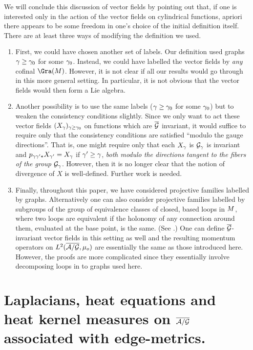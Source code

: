 \medskip

We will conclude this discussion of vector fields by pointing out
that, if one is interested only in the action of the vector fields on
cylindrical functions, apriori there appears to be some freedom in
one's choice of the initial definition itself. There are at least
three ways of modifying the definition we used.
 
\begin{enumerate}
\item First, we could have chosen another set of labels. Our definition
used graphs $\g\ge\g_0$ for some $\g_0$. Instead, we could have
labelled the vector fields by {\it any} cofinal $\Gra(\S)$.
However, it is not clear if all our results would go through in this
more general setting. In particular, it is not obvious that the vector
fields would then form a Lie algebra.
\item
Another possibility is to use the same labels ($\g\ge\g_0$ for some
$\g_0$) but to weaken the consistency conditions slightly. Since we
only want to act these vector fields $(X_\g)_{\g\ge\g_0}$ on functions
which are $\Gb$ invariant, it would suffice to require only that the
consistency conditions are satisfied ``modulo the gauge directions''.
That is, one might require only that each $X_\g$ is $\G_\g$ is
invariant and $p_{\g\g'\star}X_{\g'} = X_\g$ if $\g'\ge \g$, {\it both
modulo the directions tangent to the fibers of the group $\G_\g$}.
However, then it is no longer clear that the notion of divergence of
$X$ is well-defined. Further work is needed.
\item
Finally, throughout this paper, we have considered projective families
labelled by graphs. Alternatively one can also consider projective
families labelled by subgroups of the group of equivalence classes of
closed, based loops in $\S$, where two loops are equivalent if the
holonomy of any connection around them, evaluated at the base point,
is the same. (See \cite{MM,AL2}.) One can define $\Gb$-invariant
vector fields in this setting as well and the resulting momentum
operators on $L^2(\agb, \mu_o)$ are essentially the same as those
introduced here. However, the proofs are more complicated since they 
essentially involve decomposing loops in to graphs used here.
\end{enumerate}


\section{Laplacians, heat equations and heat kernel
measures on $\agb$ associated with edge-metrics.}

